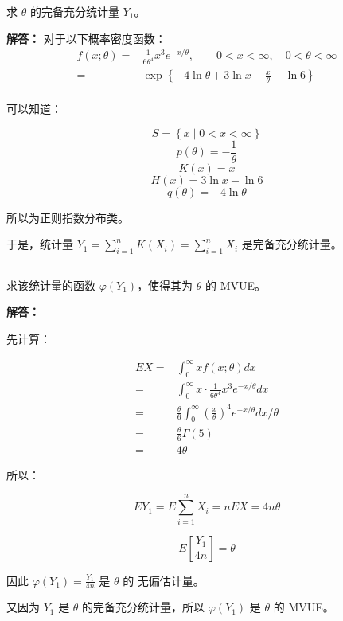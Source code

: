 \documentclass[12pt,a4paper]{article}
\begin{document}
求 $\theta$ 的完备充分统计量 $Y_1$。

\begin{answerbox}
\textbf{解答：}
对于以下概率密度函数：
\[
\begin{aligned}
f(x;\theta)=&\frac{1}{6\theta^4}x^3e^{-x/\theta},\qquad 0<x<\infty,\quad 0<\theta<\infty \\
=& \exp\left\{-4\ln \theta + 3\ln x - \frac{x}{\theta} - \ln 6\right\} \\
\end{aligned}
\]

可以知道：

$$
S = \left\{x \mid 0 < x < \infty\right\}
$$
$$
p(\theta) = -\frac{1}{\theta}
$$
$$
K(x) = x
$$
$$
H(x) = 3\ln x - \ln 6
$$
$$
q(\theta) = -4 \ln \theta
$$

所以为正则指数分布类。

于是，统计量 $Y_1 = \sum_{i=1}^{n} K(X_i) = \sum_{i=1}^{n} X_i$ 是完备充分统计量。

\end{answerbox}

\subsection{}

求该统计量的函数 $\varphi(Y_1)$，使得其为 $\theta$ 的 MVUE。

\begin{answerbox}
\textbf{解答：}

先计算：

$$
\begin{aligned}
EX =& \int_{0}^{\infty} x f(x;\theta) dx \\
=& \int_{0}^{\infty} x \cdot \frac{1}{6\theta^4}x^3e^{-x/\theta} dx \\
=& \frac{\theta}{6} \int_{0}^{\infty}  \left(\frac{x}{\theta}\right)^4 e^{-x/\theta} dx/\theta \\
=& \frac{\theta}{6} \varGamma(5) \\
=& 4\theta
\end{aligned}
$$

所以：

$$
EY_1 = E\sum_{i=1}^{n} X_i = n EX = 4n\theta
$$

$$
E\left[\frac{Y_1}{4n}\right] = \theta
$$

因此 $\varphi(Y_1) = \frac{Y_1}{4n}$ 是 $\theta$ 的 无偏估计量。

又因为 $Y_1$ 是 $\theta$ 的完备充分统计量，所以 $\varphi(Y_1)$ 是 $\theta$ 的 MVUE。

\end{answerbox}
\end{document}

